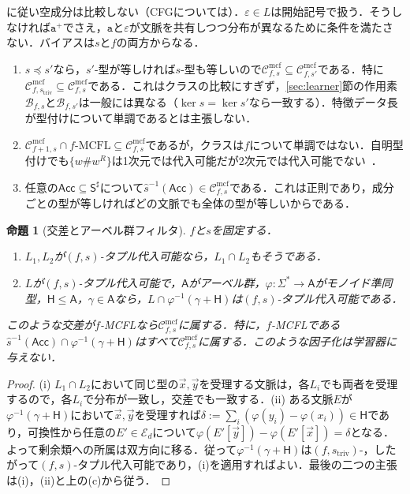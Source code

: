 \documentclass[11pt,a4paper]{ltjsarticle}
\numberwithin{equation}{section}
\theoremstyle{plain}
\newtheorem{proposition}[theorem]{命題}
\theoremstyle{definition}
\theoremstyle{remark}
\newcommand{\Cmcf}[2]{\mathcal{C}^{\mathrm{mcf}}_{#1,#2}}
\newcommand{\tuple}[1]{\vec{#1}}
\newcommand{\eps}{\varepsilon}
\begin{document}
\cite[Section~3.1 and footnote~3]{Yoshinaka2011}に従い空成分は比較しない（CFGについては\cite{Clark2013}）．$\eps\in L$は開始記号で扱う．そうしなければ$\mathtt a^+$でさえ，$\mathtt a$と$\eps$が文脈を共有しつつ分布が異なるために条件を満たさない．バイアスは$s$と$f$の両方からなる．
\begin{enumerate}[label=\textup{(\alph*)},leftmargin=*]
\item $s\preceq s'$なら，$s'$-型が等しければ$s$-型も等しいので$\Cmcf{f}{s}\subseteq\Cmcf{f}{s'}$である．特に$\Cmcf{f}{s_{\mathrm{triv}}}\subseteq\Cmcf{f}{s}$である．これはクラスの比較にすぎず，\ref{sec:learner}節の作用素$\mathcal B_{f,s}$と$\mathcal B_{f,s'}$は一般には異なる（$\ker s=\ker s'$なら一致する）．特徴データ長が型付けについて単調であるとは主張しない．
\item $\Cmcf{f+1}{s}\cap f\text{-}\mathrm{MCFL}\subseteq\Cmcf{f}{s}$であるが，クラスは$f$について単調ではない．自明型付けでも$\{w\mathtt{\#}w^R\}$は1次元では代入可能だが2次元では代入可能でない~\cite[Section~3.1, Example~5]{Yoshinaka2011}．
\item 任意の$\mathsf{Acc}\subseteq\mathsf S^\sharp$について$\widehat{s}^{-1}(\mathsf{Acc})\in\Cmcf{f}{s}$である．これは正則であり，成分ごとの型が等しければどの文脈でも全体の型が等しいからである．
\end{enumerate}

\begin{proposition}[交差とアーベル群フィルタ]
\label{prop:abelian-coset-filter}
$f$と$s$を固定する．
\begin{enumerate}[label=(\roman*),leftmargin=*]
\item $L_1,L_2$が$(f,s)$-タプル代入可能なら，$L_1\cap L_2$もそうである．
\item $L$が$(f,s)$-タプル代入可能で，$\mathsf A$がアーベル群，$\varphi:\Sigma^*\to\mathsf A$がモノイド準同型，$\mathsf H\le\mathsf A$，$\gamma\in\mathsf A$なら，$L\cap\varphi^{-1}(\gamma+\mathsf H)$は$(f,s)$-タプル代入可能である．
\end{enumerate}
このような交差が$f$-MCFLなら$\Cmcf{f}{s}$に属する．特に，$f$-MCFLである$\widehat{s}^{-1}(\mathsf{Acc})\cap\varphi^{-1}(\gamma+\mathsf H)$はすべて$\Cmcf{f}{s}$に属する．このような因子化は学習器に与えない．
\end{proposition}

\begin{proof}
(i) $L_1\cap L_2$において同じ型の$\tuple x,\tuple y$を受理する文脈は，各$L_i$でも両者を受理するので，各$L_i$で分布が一致し，交差でも一致する．(ii) ある文脈$E$が$\varphi^{-1}(\gamma+\mathsf H)$において$\tuple x,\tuple y$を受理すれば$\delta:=\sum_i(\varphi(y_i)-\varphi(x_i))\in\mathsf H$であり，可換性から任意の$E'\in\mathcal E_d$について$\varphi(E'[\tuple y])-\varphi(E'[\tuple x])=\delta$となる．よって剰余類への所属は双方向に移る．従って$\varphi^{-1}(\gamma+\mathsf H)$は$(f,s_{\mathrm{triv}})$-，したがって$(f,s)$-タプル代入可能であり，(i)を適用すればよい．最後の二つの主張は(i)，(ii)と上の(c)から従う．
\end{proof}
\end{document}
